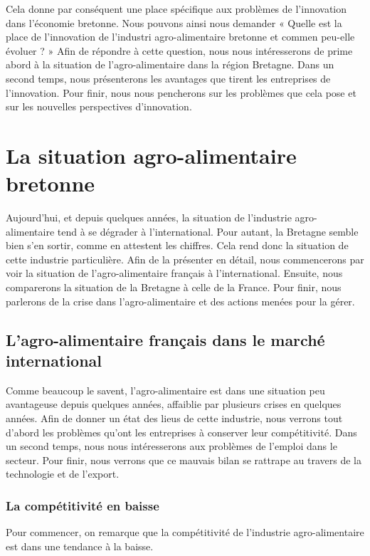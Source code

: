 \documentclass[a4paper,10pt]{report}
\begin{document}
	 Cela donne par conséquent une place spécifique aux problèmes de l'innovation dans l’économie bretonne. Nous pouvons ainsi nous demander « Quelle est la place de l'innovation de l'industri agro-alimentaire bretonne et commen peu-elle évoluer ? » Afin de répondre à cette question, nous nous intéresserons de prime abord à la situation de l’agro-alimentaire dans la région Bretagne. Dans un second temps, nous présenterons les avantages que tirent les entreprises de l'innovation. Pour finir, nous nous pencherons sur les problèmes que cela pose et sur les nouvelles perspectives d'innovation.
	 
\chapter{La situation agro-alimentaire bretonne}
	Aujourd’hui, et depuis quelques années, la situation de l’industrie agro-alimentaire tend à se dégrader à l’international. Pour autant, la Bretagne semble bien s’en sortir, comme en attestent les chiffres. Cela rend donc la situation de cette industrie particulière. Afin de la présenter en détail, nous commencerons par voir la situation de l’agro-alimentaire français à l’international. Ensuite, nous comparerons la situation de la Bretagne à celle de la France. Pour finir, nous parlerons de la crise dans l’agro-alimentaire et des actions menées pour la gérer.

	\section{L’agro-alimentaire français dans le marché international}
		Comme beaucoup le savent, l’agro-alimentaire est dans une situation peu avantageuse depuis quelques années, affaiblie par plusieurs crises en quelques années. Afin de donner un état des lieus de cette industrie, nous verrons tout d’abord les problèmes qu’ont les entreprises à conserver leur compétitivité. Dans un second temps, nous nous intéresserons aux problèmes de l’emploi dans le secteur. Pour finir, nous verrons que ce mauvais bilan se rattrape au travers de la technologie et de l’export.

		\subsection{La compétitivité en baisse}
			Pour commencer, on remarque que la compétitivité de l’industrie agro-alimentaire est dans une tendance à la baisse.
			
\end{document}
